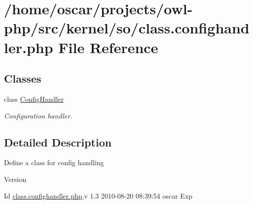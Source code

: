 \section{/home/oscar/projects/owl-\/php/src/kernel/so/class.confighandler.php File Reference}
\label{class_8confighandler_8php}
\subsection*{Classes}
\begin{DoxyCompactItemize}
\item 
class \hyperlink{classConfigHandler}{ConfigHandler}
\begin{DoxyCompactList}\small\item\em Configuration handler. \item\end{DoxyCompactList}\end{DoxyCompactItemize}


\subsection{Detailed Description}
Define a class for config handling \begin{DoxyVersion}{Version}

\end{DoxyVersion}
\begin{DoxyParagraph}{Id}
\hyperlink{class_8confighandler_8php}{class.confighandler.php},v 1.3 2010-\/08-\/20 08:39:54 oscar Exp 
\end{DoxyParagraph}
